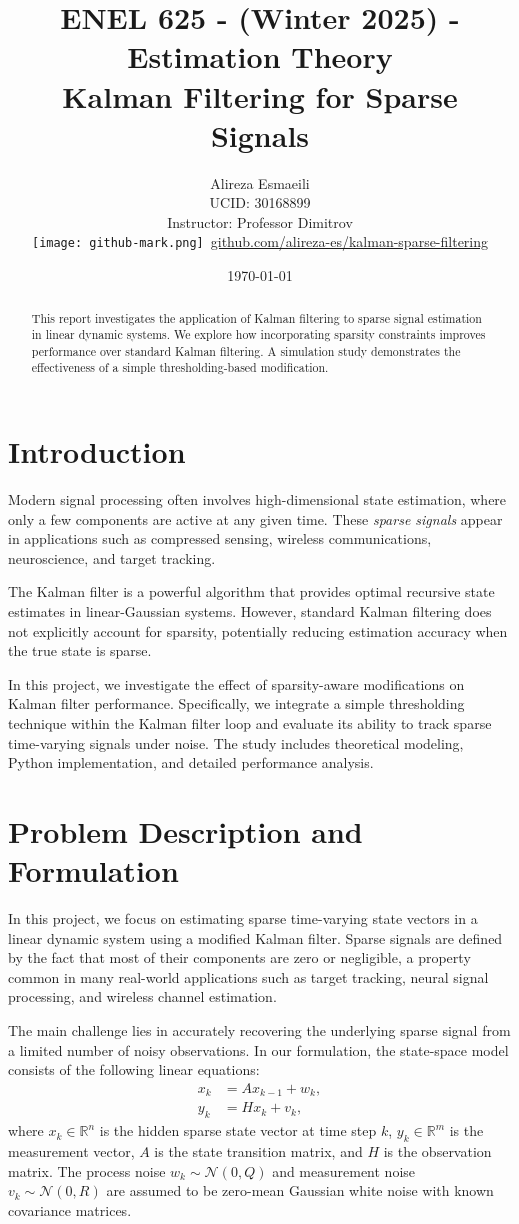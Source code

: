 \documentclass[12pt]{article}
\title{ENEL 625 - (Winter 2025) - Estimation Theory \\ Kalman Filtering for Sparse Signals}
\author{Alireza Esmaeili \\ UCID: 30168899 \\ Instructor: Professor Dimitrov \\ \texttt{[image: github-mark.png]}~\href{https://github.com/alireza-es/kalman-sparse-filtering}{github.com/alireza-es/kalman-sparse-filtering}}
\date{\today}
\begin{document}
\maketitle

\begin{abstract}
This report investigates the application of Kalman filtering to sparse signal estimation in linear dynamic systems. We explore how incorporating sparsity constraints improves performance over standard Kalman filtering. A simulation study demonstrates the effectiveness of a simple thresholding-based modification.
\end{abstract}

\section{Introduction}
Modern signal processing often involves high-dimensional state estimation, where only a few components are active at any given time. These \textit{sparse signals} appear in applications such as compressed sensing, wireless communications, neuroscience, and target tracking.

The Kalman filter is a powerful algorithm that provides optimal recursive state estimates in linear-Gaussian systems. However, standard Kalman filtering does not explicitly account for sparsity, potentially reducing estimation accuracy when the true state is sparse.

In this project, we investigate the effect of sparsity-aware modifications on Kalman filter performance. Specifically, we integrate a simple thresholding technique within the Kalman filter loop and evaluate its ability to track sparse time-varying signals under noise. The study includes theoretical modeling, Python implementation, and detailed performance analysis.

\section{Problem Description and Formulation}
In this project, we focus on estimating sparse time-varying state vectors in a linear dynamic system using a modified Kalman filter. Sparse signals are defined by the fact that most of their components are zero or negligible, a property common in many real-world applications such as target tracking, neural signal processing, and wireless channel estimation.

The main challenge lies in accurately recovering the underlying sparse signal from a limited number of noisy observations. In our formulation, the state-space model consists of the following linear equations:
\begin{align}
    x_k &= A x_{k-1} + w_k, \\
    y_k &= H x_k + v_k,
\end{align}
where $x_k \in \mathbb{R}^n$ is the hidden sparse state vector at time step $k$, $y_k \in \mathbb{R}^m$ is the measurement vector, $A$ is the state transition matrix, and $H$ is the observation matrix. The process noise $w_k \sim \mathcal{N}(0, Q)$ and measurement noise $v_k \sim \mathcal{N}(0, R)$ are assumed to be zero-mean Gaussian white noise with known covariance matrices.
\end{document}

